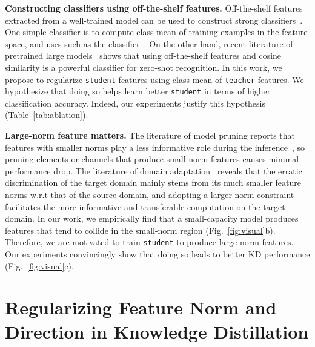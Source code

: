 \documentclass{article}
\begin{document}
 




{\bf Constructing classifiers using off-the-shelf features.}
Off-the-shelf features extracted from a well-trained model can be used to construct strong classifiers~\cite{donahue2014decaf, sharif2014cnn, kong2021opengan}.
One simple classifier is to compute class-mean  of training examples in the feature space, and uses such as the classifier~\cite{donahue2014decaf, sharif2014cnn, kong2021opengan}.
On the other hand, recent literature of pretrained large models~\cite{radford2021learning} shows that using off-the-shelf features and cosine similarity is a powerful classifier for zero-shot recognition. 
In this work, we propose to regularize {\tt student} features using class-mean of {\tt teacher} features.
We hypothesize that doing so helps learn better {\tt student} in terms of higher classification accuracy. 
Indeed, our experiments justify this hypothesis (Table~\ref{tab:ablation}).


\textbf{Large-norm feature matters.}
The literature of model pruning reports that features with smaller norms play a less informative role during the inference~\cite{ye2018rethinking}, so pruning elements or channels that produce small-norm features causes minimal performance drop.
The literature of domain adaptation~\cite{xu2019larger} reveals that the erratic discrimination of the target domain mainly stems from its much smaller feature norms w.r.t that of the source domain, and adopting a larger-norm constraint facilitates the more informative and transferable computation on the target domain. 
In our work, we empirically find that a small-capacity model produces features that tend to collide in the small-norm region (Fig.~\ref{fig:visual}b).
Therefore, we are motivated to train {\tt student} to produce large-norm features. 
Our experiments convincingly show that doing so leads to better KD performance (Fig.~\ref{fig:visual}c).












 




\section{Regularizing Feature Norm and Direction in Knowledge Distillation}
\end{document}

